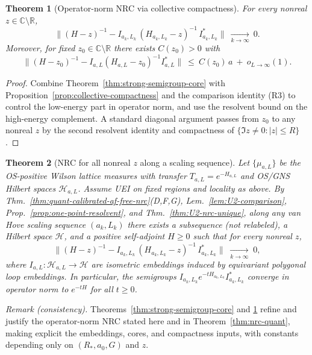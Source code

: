 \documentclass[11pt]{amsart}
\theoremstyle{plain}
\newtheorem{theorem}{Theorem}[section]
\theoremstyle{definition}
\theoremstyle{remark}
\begin{document}
\begin{theorem}[Operator-norm NRC via collective compactness]\label{thm:nrc-operator-norm}
For every nonreal $z\in\mathbb C\setminus\mathbb R$,
\[
  \big\|(H-z)^{-1} - I_{a_k,L_k}\,(H_{a_k,L_k}-z)^{-1}\,I_{a_k,L_k}^*\big\|\ \xrightarrow[k\to\infty]{}\ 0.
\]
Moreover, for fixed $z_0\in\mathbb C\setminus\mathbb R$ there exists $C(z_0)>0$ with
\[
  \big\|(H-z_0)^{-1} - I_{a,L}(H_{a,L}-z_0)^{-1} I_{a,L}^*\big\|\ \le\ C(z_0)\,a\ +\ o_{L\to\infty}(1).
\]
\end{theorem}
\begin{proof}
Combine Theorem~\ref{thm:strong-semigroup-core} with Proposition~\ref{prop:collective-compactness} and the comparison identity (R3) to control the low-energy part in operator norm, and use the resolvent bound on the high-energy complement. A standard diagonal argument passes from $z_0$ to any nonreal $z$ by the second resolvent identity and compactness of $\{\Im z\ne 0:|z|\le R\}$.
\end{proof}

\begin{theorem}[NRC for all nonreal $z$ along a scaling sequence]\label{thm:nrc-embeddings}
Let $\{\mu_{a,L}\}$ be the OS-positive Wilson lattice measures with transfer $T_{a,L}=e^{-H_{a,L}}$ and OS/GNS Hilbert spaces $\mathcal H_{a,L}$. Assume UEI on fixed regions and locality as above. By Thm.~\ref{thm:quant-calibrated-af-free-nrc}(D,F,G), Lem.~\ref{lem:U2-comparison}, Prop.~\ref{prop:one-point-resolvent}, and Thm.~\ref{thm:U2-nrc-unique}, along any van Hove scaling sequence $(a_k,L_k)$ there exists a subsequence (not relabeled), a Hilbert space $\mathcal H$, and a positive self-adjoint $H\ge 0$ such that for every nonreal $z$,
\[
  \big\|(H-z)^{-1} - I_{a_k,L_k}\,(H_{a_k,L_k}-z)^{-1}\,I_{a_k,L_k}^*\big\|\;\xrightarrow[k\to\infty]{}\;0,
\]
where $I_{a,L}:\mathcal H_{a,L}\to\mathcal H$ are isometric embeddings induced by equivariant polygonal loop embeddings. In particular, the semigroups $I_{a_k,L_k} e^{-tH_{a_k,L_k}} I_{a_k,L_k}^*$ converge in operator norm to $e^{-tH}$ for all $t\ge 0$.
\end{theorem}
\noindent\emph{Remark (consistency).} Theorems~\ref{thm:strong-semigroup-core} and \ref{thm:nrc-operator-norm} refine and justify the operator-norm NRC stated here and in Theorem~\ref{thm:nrc-quant}, making explicit the embeddings, cores, and compactness inputs, with constants depending only on $(R_*,a_0,G)$ and $z$.
\end{document}

